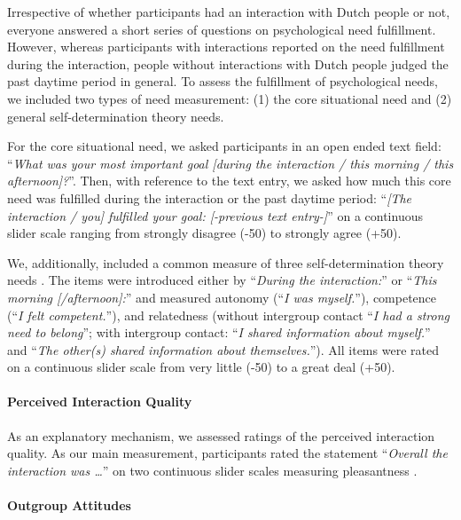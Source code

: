 Irrespective of whether participants had an interaction with Dutch
people or not, everyone answered a short series of questions on
psychological need fulfillment. However, whereas participants with
interactions reported on the need fulfillment during the interaction,
people without interactions with Dutch people judged the past daytime
period in general. To assess the fulfillment of psychological needs, we
included two types of need measurement: (1) the core situational need
and (2) general self-determination theory needs.

For the core situational need, we asked participants in an open ended
text field:
``\textit{What was your most important goal [during the interaction / this morning / this afternoon]?}''.
Then, with reference to the text entry, we asked how much this core need
was fulfilled during the interaction or the past daytime period:
``\textit{[The interaction / you] fulfilled your goal: [-previous text entry-]}''
on a continuous slider scale ranging from strongly disagree (-50) to
strongly agree (+50).

We, additionally, included a common measure of three self-determination
theory needs \citep[see][]{Downie2008}. The items were introduced either
by ``\textit{During the interaction:}'' or
``\textit{This morning [/afternoon]:}'' and measured autonomy
(``\textit{I was myself.}''), competence
(``\textit{I felt competent.}''), and relatedness (without intergroup
contact ``\textit{I had a strong need to belong}''; with intergroup
contact: ``\textit{I shared information about myself.}'' and
``\textit{The other(s) shared information about themselves.}''). All
items were rated on a continuous slider scale from very little (-50) to
a great deal (+50).

\paragraph{Perceived Interaction Quality}

As an explanatory mechanism, we assessed ratings of the perceived
interaction quality. As our main measurement, participants rated the
statement ``\textit{Overall the interaction was …}'' on two continuous
slider scales measuring pleasantness
\citep[from unpleasant (-50) to pleasant (+50)) and meaningfulness (from superficial (-50) to meaningful (+50); both items adapted from][]{Downie2008}.

\paragraph{Outgroup Attitudes}


